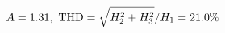 \documentclass[preview]{standalone}
\begin{document}
\begin{align*}
\special{dvisvgm:raw <g id='unique000'>}A=1.31,\ \text{THD}=\sqrt{H_2^2+H_3^2}/H_1=21.0\%\special{dvisvgm:raw </g>}
\end{align*}
\end{document}
